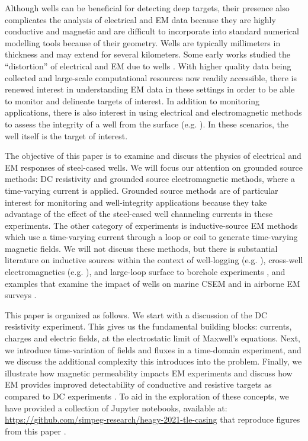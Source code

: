 \documentclass[
    paper
]{geophysics}
\begin{document}
Although wells can be beneficial for detecting deep targets, their presence also complicates the analysis of electrical and EM data because they are highly conductive and magnetic and are difficult to incorporate into standard numerical modelling tools because of their geometry. Wells are typically millimeters in thickness and may extend for several kilometers. Some early works studied the ``distortion'' of electrical and EM due to wells \citep{Wait1983, Holladay1984, Johnston1987}. With higher quality data being collected and large-scale computational resources now readily accessible, there is renewed interest in understanding EM data in these settings in order to be able to monitor and delineate targets of interest. In addition to monitoring applications, there is also interest in using electrical and electromagnetic methods to assess the integrity of a well from the surface (e.g. \cite{Beskardes2021, Wilt2020}). In these scenarios, the well itself is the target of interest.

The objective of this paper is to examine and discuss the physics of electrical and EM responses of steel-cased wells. We will focus our attention on grounded source methods: DC resistivity and grounded source electromagnetic methods, where a time-varying current is applied. Grounded source methods are of particular interest for monitoring and well-integrity applications because they take advantage of the effect of the steel-cased well channeling currents in these experiments. The other category of experiments is inductive-source EM methods which use a time-varying current through a loop or coil to generate time-varying magnetic fields. We will not discuss these methods, but there is substantial literature on inductive sources within the context of well-logging (e.g. \cite{Wu1994}), cross-well electromagnetics (e.g. \cite{Uchida1991, Nekut1995}), and large-loop surface to borehole experiments \citep{Augustin1989}, and examples that examine the impact of wells on marine CSEM \citep{Swidinsky2013} and in airborne EM surveys \citep{Kang2020a}.

This paper is organized as follows. We start with a discussion of the DC resistivity experiment. This gives us the fundamental building blocks: currents, charges and electric fields, at the electrostatic limit of Maxwell’s equations. Next, we introduce time-variation of fields and fluxes in a time-domain experiment, and we discuss the additional complexity this introduces into the problem. Finally, we illustrate how magnetic permeability impacts EM experiments and discuss how EM provides improved detectability of conductive and resistive targets as compared to DC experiments . To aid in the exploration of these concepts, we have provided a collection of Jupyter notebooks, available at: \href{https://github.com/simpeg-research/heagy-2021-tle-casing}{https://github.com/simpeg-research/heagy-2021-tle-casing} that reproduce figures from this paper \citep{Heagy2021software}.
\end{document}
